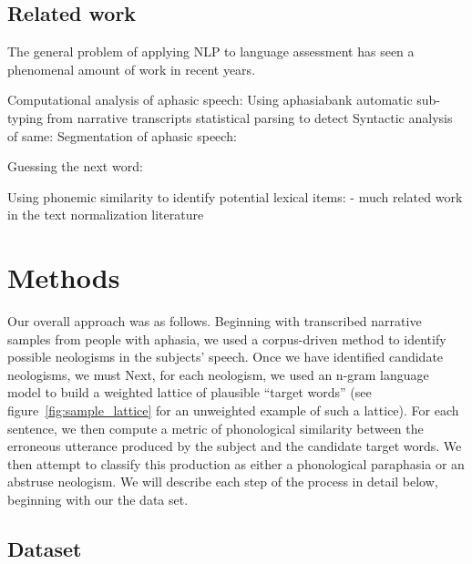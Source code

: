 \documentclass[11pt,letterpaper]{article}
\begin{document}
\subsection{Related work} %
\label{sub:related_work}

The general problem of applying NLP to language assessment has seen a phenomenal amount of work in recent years.

Computational analysis of aphasic speech:
    Using aphasiabank \cite{MacWhinney:2011er}
    automatic sub-typing from narrative transcripts\cite{Fraser:2014bg}
    statistical parsing to detect\cite{fraser-EtAl:2014:W14-34}
        Syntactic analysis of same: \cite{Goodglass:1994dp}
Segmentation of aphasic speech: \cite{fraser-EtAl:2015:NAACL-HLT}

Guessing the next word: \cite{Shannon:1951p5641}

Using phonemic similarity to identify potential lexical items: \cite{Han:Baldwin:11,Choudhury:2007:IMS:1326044.1326048}
    - much related work in the text normalization literature \cite{Sproat:2001p5321}


\section{Methods}

Our overall approach was as follows.
Beginning with transcribed narrative samples from people with aphasia, we used a corpus-driven method to identify possible neologisms in the subjects' speech.
Once we have identified candidate neologisms, we must
Next, for each neologism, we used an n-gram language model to build a weighted lattice of plausible ``target words'' (see figure~\ref{fig:sample_lattice} for an unweighted example of such a lattice).
For each sentence, we then compute a metric of phonological similarity between the erroneous utterance produced by the subject and the candidate target words.
We then attempt to classify this production as either a phonological paraphasia or an abstruse neologism.
We will describe each step of the process in detail below, beginning with our the data set.

\subsection{Dataset} %
\label{sub:dataset}
\end{document}

